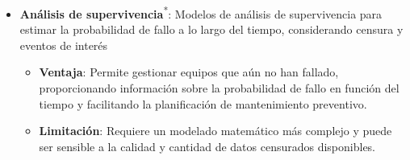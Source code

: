 \documentclass[IB]{TFUOC}
\begin{document}
\begin{itemize}
\begin{itemize}
                de fallo, lo que puede limitar la capacidad de planificación de mantenimiento.
        \end{itemize}
  \item \textbf{Análisis de supervivencia}\textsuperscript{*}: Modelos de análisis de supervivencia para estimar la
        probabilidad de fallo a lo largo del tiempo, considerando censura y eventos de interés
        \begin{itemize}
          \item \textbf{Ventaja}: Permite gestionar equipos que aún no han fallado, proporcionando información sobre la
                probabilidad de fallo en función del tiempo y facilitando la planificación de mantenimiento preventivo.
          \item \textbf{Limitación}: Requiere un modelado matemático más complejo y puede ser sensible a la calidad y
                cantidad de datos censurados disponibles.
        \end{itemize}
\end{itemize}
\end{document}
